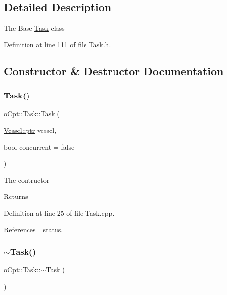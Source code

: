 \subsection{Detailed Description}
The Base \hyperlink{classo_cpt_1_1_task}{Task} class 

Definition at line 111 of file Task.\+h.



\subsection{Constructor \& Destructor Documentation}
\hypertarget{classo_cpt_1_1_task_a814069aa4c458d09807eb78937702521}{}\label{classo_cpt_1_1_task_a814069aa4c458d09807eb78937702521} 
\subsubsection{\texorpdfstring{Task()}{Task()}}
{\footnotesize\ttfamily o\+Cpt\+::\+Task\+::\+Task (\begin{DoxyParamCaption}\item[{\hyperlink{classo_cpt_1_1i_vessel_a43711a596f3bdfd0ca732ed3901edc97}{Vessel\+::ptr}}]{vessel,  }\item[{bool}]{concurrent = {\ttfamily false} }\end{DoxyParamCaption})}

The contructor \begin{DoxyReturn}{Returns}

\end{DoxyReturn}


Definition at line 25 of file Task.\+cpp.



References \+\_\+status.

\hypertarget{classo_cpt_1_1_task_a95accf06842f78630e44190c15d6fca4}{}\label{classo_cpt_1_1_task_a95accf06842f78630e44190c15d6fca4} 
\subsubsection{\texorpdfstring{$\sim$\+Task()}{~Task()}}
{\footnotesize\ttfamily o\+Cpt\+::\+Task\+::$\sim$\+Task (\begin{DoxyParamCaption}{ }\end{DoxyParamCaption})\hspace{0.3cm}{\ttfamily [virtual]}}

